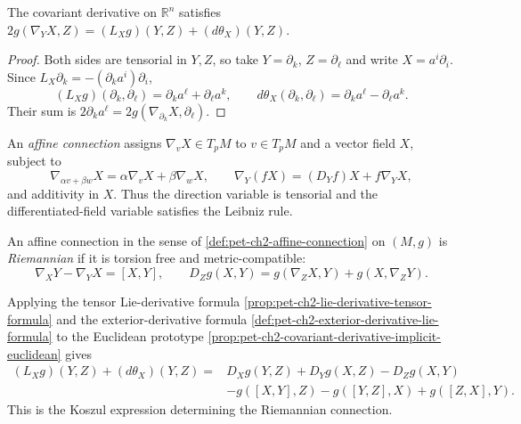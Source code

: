 \begin{proposition}
  \label{prop:pet-ch2-covariant-derivative-implicit-euclidean}
  \leanok
  The covariant derivative on $\mathbb{R}^n$ satisfies
  $2g(\nabla_YX,Z)=(L_Xg)(Y,Z)+(d\theta_X)(Y,Z)$.
\end{proposition}
\begin{proof}
  \leanok
  \sketch
  Both sides are
  tensorial in $Y,Z$, so take $Y=\partial_k$, $Z=\partial_\ell$ and write
  $X=a^i\partial_i$. Since
  $L_X\partial_k=-(\partial_k a^i)\partial_i$,
  \[
    (L_Xg)(\partial_k,\partial_\ell)
       =\partial_k a^\ell+\partial_\ell a^k,\qquad
    d\theta_X(\partial_k,\partial_\ell)
       =\partial_k a^\ell-\partial_\ell a^k.
  \]
  Their sum is $2\partial_k a^\ell
  =2g(\nabla_{\partial_k}X,\partial_\ell)$.
\end{proof}

\begin{definition}
  \label{def:pet-ch2-affine-connection}
  \leanok
  An \emph{affine connection} assigns
  $\nabla_vX\in T_pM$ to $v\in T_pM$ and a vector field $X$, subject to
  \[
    \nabla_{\alpha v+\beta w}X
      =\alpha\nabla_vX+\beta\nabla_wX,
    \qquad
    \nabla_Y(fX)=(D_Yf)X+f\nabla_YX,
  \]
  and additivity in $X$. Thus the direction variable is tensorial and the
  differentiated-field variable satisfies the Leibniz rule.
\end{definition}

\begin{definition}
  \label{def:pet-ch2-riemannian-connection}
  \leanok
  An affine connection in the sense of
  \cref{def:pet-ch2-affine-connection} on $(M,g)$
  is \emph{Riemannian} if it is torsion free and metric-compatible:
  \[
    \nabla_XY-\nabla_YX=[X,Y],
    \qquad
    D_Zg(X,Y)=g(\nabla_ZX,Y)+g(X,\nabla_ZY).
  \]
\end{definition}

\begin{remark}
  \label{rem:pet-ch2-koszul-formula}
  \leanok
  Applying the tensor Lie-derivative formula
  \cref{prop:pet-ch2-lie-derivative-tensor-formula} and the exterior-derivative
  formula \cref{def:pet-ch2-exterior-derivative-lie-formula} to the Euclidean
  prototype \cref{prop:pet-ch2-covariant-derivative-implicit-euclidean} gives
  \[
  \begin{aligned}
    (L_Xg)(Y,Z)+(d\theta_X)(Y,Z)
      ={}&D_Xg(Y,Z)+D_Yg(X,Z)-D_Zg(X,Y)\\
         &-g([X,Y],Z)-g([Y,Z],X)+g([Z,X],Y).
  \end{aligned}
  \]
  This is the Koszul expression determining the Riemannian connection.
\end{remark}


